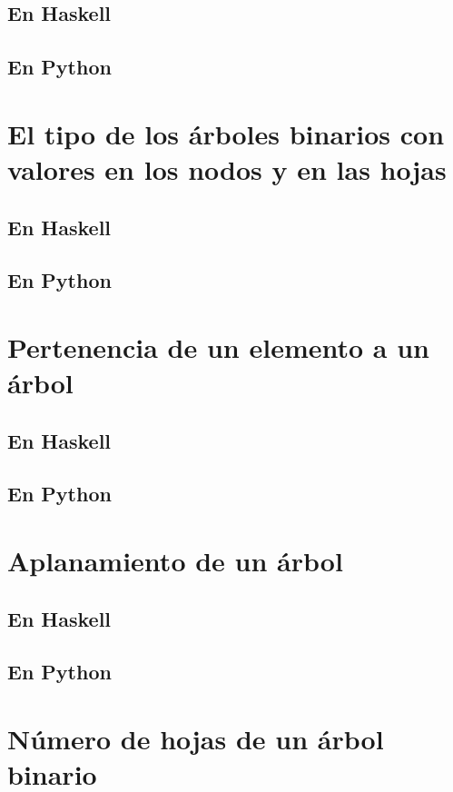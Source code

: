 \documentclass[a4paper,12pt,twoside]{book}
\begin{document}
\subsection*{En Haskell}
\subsection*{En Python}

\section{El tipo de los árboles binarios con valores en los nodos y en
  las hojas}
\subsection{En Haskell}
\subsection{En Python}

\section{Pertenencia de un elemento a un árbol}
\subsection{En Haskell}
\subsection{En Python}

\section{Aplanamiento de un árbol}
\subsection{En Haskell}
\subsection{En Python}

\section{Número de hojas de un árbol binario}
\end{document}
